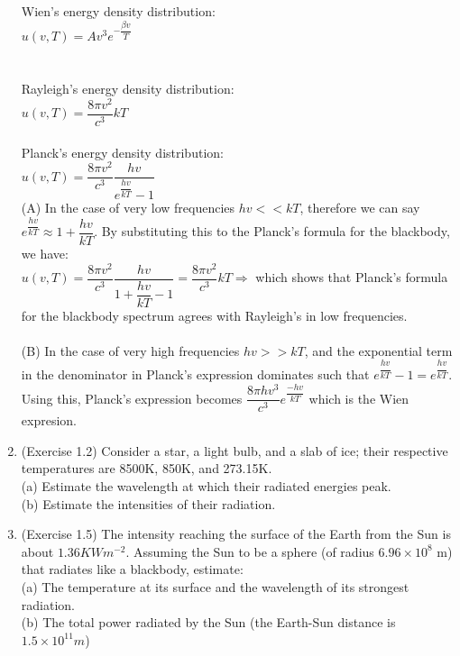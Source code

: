 \documentclass[fleqn]{article}
\begin{document}
\begin{enumerate}
      \textcolor{hwColor}{
        Wien’s energy density distribution: \\
        $u(v,T)=Av^3e^{-\dfrac{\beta v}{T}}$ \\
        \\
        \\
        Rayleigh’s energy density distribution: \\
        $u(v,T)=\dfrac{8 \pi v^2}{c^3}kT$ \\
        \\ 
        Planck’s energy density distribution: \\
        $u(v,T)=\dfrac{8 \pi v^2}{c^3}\dfrac{hv}{e^{\dfrac{hv}{kT}}-1}$
        \\
        (A) In the case of very low frequencies $hv<<kT$, therefore we can say $e^{\dfrac{hv}{kT}}\approx 1+\dfrac{hv}{kT}$. By substituting this 
        to the Planck’s formula for the blackbody, we have: \\
        $u(v,T)=\dfrac{8 \pi v^2}{c^3}\dfrac{hv}{1+\dfrac{hv}{kT}-1}=\dfrac{8 \pi v^2}{c^3}kT \Rightarrow $ which shows that Planck’s formula for the blackbody
        spectrum agrees with Rayleigh’s in low frequencies. \\
        \\
        (B) In the case of very high frequencies $hv>>kT$, and the exponential term in the denominator in Planck’s expression dominates
        such that $e^{\dfrac{hv}{kT}}-1=e^{\dfrac{hv}{kT}}$. Using this, Planck’s expression becomes $\dfrac{8 \pi h v^3}{c^3}e^{\dfrac{-hv}{kT}}$
        which is the Wien expresion.
      }

    \item (Exercise 1.2) Consider a star, a light bulb, and a slab of ice; their respective temperatures are 8500K, 850K, and 273.15K. \\
    (a) Estimate the wavelength at which their radiated energies peak. \\
    (b) Estimate the intensities of their radiation.
    
    \item (Exercise 1.5) The intensity reaching the surface of the Earth from the Sun is about $1.36 K Wm^{-2}$. Assuming the Sun to be a sphere (of radius $6.96 \times 10^8$ m) that radiates like a blackbody, estimate: \\
    (a) The temperature at its surface and the wavelength of its strongest radiation. \\
    (b) The total power radiated by the Sun (the Earth-Sun distance is $1.5 \times 10^{11} m$)
    

\end{enumerate}
\end{document}
